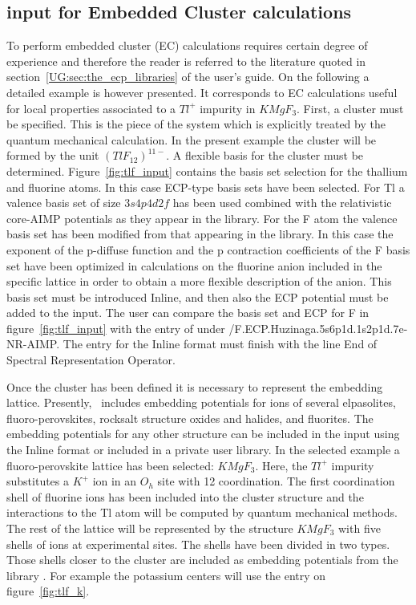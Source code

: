 \subsection{ input for Embedded Cluster calculations}


To perform embedded cluster (EC) calculations requires certain degree
of experience and therefore the reader is referred to the literature
quoted in section~\ref{UG:sec:the_ecp_libraries} of the user's guide. 
On the following a detailed example is however presented. 
It corresponds to EC calculations useful for local properties
associated to a $Tl^{+}$ impurity in $KMgF_3$. First, a cluster must be 
specified. This is the piece of the system which is explicitly treated by the 
quantum mechanical calculation. In the present example the cluster will be 
formed by the unit $(TlF_{12})^{11-}$. A flexible basis for the cluster must be
determined. Figure~\ref{fig:tlf_input} contains the basis set selection
for the thallium and fluorine atoms. In this case ECP-type basis sets 
have been selected. For Tl a valence basis set of size $3s4p4d2f$ has
been used combined with the relativistic core-AIMP potentials as they
appear in the  library. For the F atom the valence 
basis set has been modified from that appearing in the  
library. In this case the exponent of the p-diffuse function and the p 
contraction coefficients
of the F basis set have been optimized in calculations on the fluorine
anion included in the specific lattice in order to obtain a more
flexible description of the anion. This
basis set must be introduced Inline, and then also the ECP potential
must be added to the input. The user can compare the basis set
and ECP for F in figure~\ref{fig:tlf_input} with the entry of 
under /F.ECP.Huzinaga.5s6p1d.1s2p1d.7e-NR-AIMP. The entry for the
Inline format must finish with the line End of Spectral Representation Operator.

Once the cluster has been defined it is necessary to represent the embedding
lattice. Presently, \molcas\ includes embedding potentials for ions of
several elpasolites, fluoro-perovskites, rocksalt structure oxides and halides,
and fluorites. The embedding potentials for any other structure can be included 
in the input using the Inline format
or included in a private user library.
In the selected example a fluoro-perovskite lattice has
been selected: $KMgF_3$. 
Here, the $Tl^{+}$ impurity substitutes a $K^{+}$ ion in an $O_h$ site with 
12 coordination.
The first coordination shell of fluorine ions  has been included into the cluster
structure and the interactions to the Tl atom will be computed by quantum
mechanical methods. The rest of the lattice will be represented by the
structure $KMgF_3$ with five shells of ions at experimental sites.
The shells have been divided in two types. Those shells closer to the
cluster are included as embedding potentials from the library .
For example the potassium centers will use the entry on figure~\ref{fig:tlf_k}.

